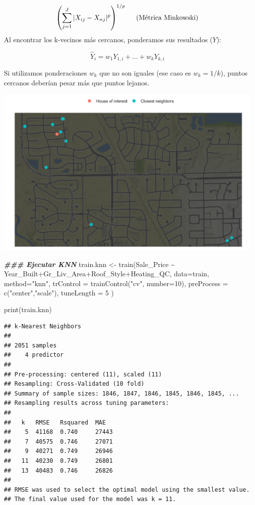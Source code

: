 \documentclass[
]{article}
\newenvironment{Shaded}{\begin{snugshade}}{\end{snugshade}}
\newcommand{\AttributeTok}[1]{\textcolor[rgb]{0.77,0.63,0.00}{#1}}
\newcommand{\DecValTok}[1]{\textcolor[rgb]{0.00,0.00,0.81}{#1}}
\newcommand{\DocumentationTok}[1]{\textcolor[rgb]{0.56,0.35,0.01}{\textbf{\textit{#1}}}}
\newcommand{\FunctionTok}[1]{\textcolor[rgb]{0.00,0.00,0.00}{#1}}
\newcommand{\NormalTok}[1]{#1}
\newcommand{\OtherTok}[1]{\textcolor[rgb]{0.56,0.35,0.01}{#1}}
\newcommand{\SpecialCharTok}[1]{\textcolor[rgb]{0.00,0.00,0.00}{#1}}
\newcommand{\StringTok}[1]{\textcolor[rgb]{0.31,0.60,0.02}{#1}}
\begin{document}
\[\left(\sum_{j=1}^J |X_{ij}-X_{nj}|^{p}\right)^{1/p} \hspace{.5 cm} \text{(Métrica Minkowski)}\]
Al encontrar los k-vecinos más cercanos, ponderamos sus resultados
(\(Y\)):

\[\hat{Y}_i=w_1Y_{1,i}+...+w_kY_{k,i}\]

Si utilizamos ponderaciones \(w_k\) que no son iguales (ese caso es
\(w_k=1/k\)), puntos cercanos deberían pesar más que puntos lejanos.

\includegraphics{4.png}

\begin{Shaded}
\begin{Highlighting}[]
\DocumentationTok{\#\#\# Ejecutar KNN}
\NormalTok{train.knn }\OtherTok{\textless{}{-}} \FunctionTok{train}\NormalTok{(Sale\_Price }\SpecialCharTok{\textasciitilde{}}\NormalTok{ Year\_Built}\SpecialCharTok{+}\NormalTok{Gr\_Liv\_Area}\SpecialCharTok{+}\NormalTok{Roof\_Style}\SpecialCharTok{+}\NormalTok{Heating\_QC, }
                   \AttributeTok{data=}\NormalTok{train, }\AttributeTok{method=}\StringTok{"knn"}\NormalTok{,  }
                   \AttributeTok{trControl =} \FunctionTok{trainControl}\NormalTok{(}\StringTok{"cv"}\NormalTok{, }\AttributeTok{number=}\DecValTok{10}\NormalTok{),}
                   \AttributeTok{preProcess =} \FunctionTok{c}\NormalTok{(}\StringTok{"center"}\NormalTok{,}\StringTok{"scale"}\NormalTok{),}
                   \AttributeTok{tuneLength =} \DecValTok{5} 
\NormalTok{)}

\FunctionTok{print}\NormalTok{(train.knn)}
\end{Highlighting}
\end{Shaded}

\begin{verbatim}
## k-Nearest Neighbors 
## 
## 2051 samples
##    4 predictor
## 
## Pre-processing: centered (11), scaled (11) 
## Resampling: Cross-Validated (10 fold) 
## Summary of sample sizes: 1846, 1847, 1846, 1845, 1846, 1845, ... 
## Resampling results across tuning parameters:
## 
##   k   RMSE   Rsquared  MAE  
##    5  41168  0.740     27443
##    7  40575  0.746     27071
##    9  40271  0.749     26946
##   11  40230  0.749     26801
##   13  40483  0.746     26826
## 
## RMSE was used to select the optimal model using the smallest value.
## The final value used for the model was k = 11.
\end{verbatim}
\end{document}
